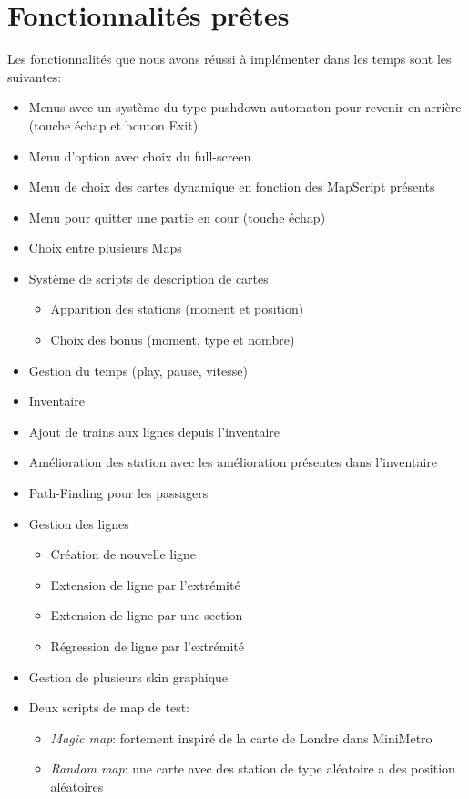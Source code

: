 \documentclass[report, backcover, french, nodocumentinfo]{upmethodology-document}
\begin{document}
	\section*{Fonctionnalités prêtes}
		\p{}
		Les fonctionnalités que nous avons réussi à implémenter dans les temps sont les suivantes:
		\begin{itemize}
			\item Menus avec un système du type pushdown automaton pour revenir en arrière (touche échap et bouton Exit)
			\item Menu d'option avec choix du full-screen
			\item Menu de choix des cartes dynamique en fonction des MapScript présents
			\item Menu pour quitter une partie en cour (touche échap)
			\item Choix entre plusieurs Maps
			\item Système de scripts de description de cartes
				\begin{itemize}
					\item Apparition des stations (moment et position)
					\item Choix des bonus (moment, type et nombre)
				\end{itemize}
			\item Gestion du temps (play, pause, vitesse)
			\item Inventaire
			\item Ajout de trains aux lignes depuis l'inventaire
			\item Amélioration des station avec les amélioration présentes dans l'inventaire
			\item Path-Finding pour les passagers
			\item Gestion des lignes
				\begin{itemize}
					\item Création de nouvelle ligne
					\item Extension de ligne par l'extrémité
					\item Extension de ligne par une section
					\item Régression de ligne par l'extrémité
				\end{itemize}
			\item Gestion de plusieurs skin graphique
			\item Deux scripts de map de test:
				\begin{itemize}
					\item \textit{Magic map}: fortement inspiré de la carte de Londre dans MiniMetro
					\item \textit{Random map}: une carte avec des station de type aléatoire a des position aléatoires
				\end{itemize}
		\end{itemize}
\end{document}

